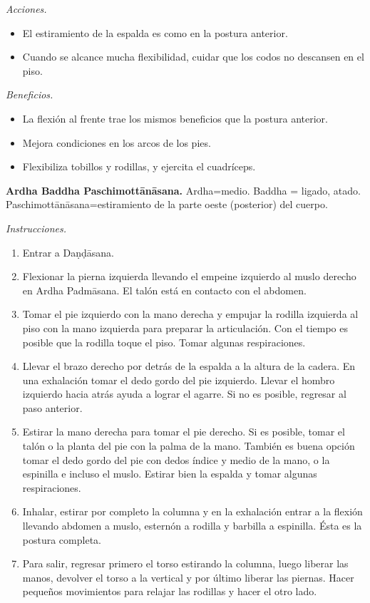 \emph{Acciones.}
\begin{itemize}
\item El estiramiento de la espalda es como
en la postura anterior.
\item Cuando se alcance mucha flexibilidad,
cuidar que los codos no descansen en el piso.
\end{itemize}

\emph{Beneficios.}
\begin{itemize}
\item La flexión al frente trae los mismos
beneficios que la postura anterior.
\item Mejora condiciones en los arcos de los
pies.
\item Flexibiliza tobillos y rodillas, y
ejercita el cuadríceps.
\end{itemize}

\medskip\noindent\textbf{Ardha Baddha
Paschimottānāsana.}
Ardha=medio. Baddha = ligado, atado.
Paschimottānāsana=estiramiento de la parte
oeste (posterior) del cuerpo.

\emph{Instrucciones.}
\begin{enumerate}
\item Entrar a Daṇḍāsana.
\item Flexionar la pierna izquierda llevando
el empeine izquierdo al muslo derecho en
Ardha Padmāsana. El talón está en contacto
con el abdomen.
\item Tomar el pie izquierdo con la mano
derecha y empujar la rodilla izquierda al
piso con la mano izquierda para preparar la
articulación. Con el tiempo es posible que la
rodilla toque el piso. Tomar algunas
respiraciones.
\item Llevar el brazo derecho por detrás de
la espalda a la altura de la cadera. En una
exhalación tomar el dedo gordo del pie
izquierdo. Llevar el hombro izquierdo hacia
atrás ayuda a lograr el agarre. Si no es
posible, regresar al paso anterior.
\item Estirar la mano derecha para tomar el
pie derecho. Si es posible, tomar el talón o
la planta del pie con la palma de la mano.
También es buena opción tomar el dedo gordo
del pie con dedos índice y medio de la mano,
o la espinilla e incluso el muslo. Estirar
bien la espalda y tomar algunas
respiraciones.
\item Inhalar, estirar por completo la
columna y en la exhalación entrar a la
flexión llevando abdomen a muslo, esternón a
rodilla y barbilla a espinilla. Ésta es la
postura completa.
\item Para salir, regresar primero el torso
estirando la columna, luego liberar las
manos, devolver el torso a la vertical y por
último liberar las piernas. Hacer pequeños
movimientos para relajar las rodillas y hacer
el otro lado.
\end{enumerate}


